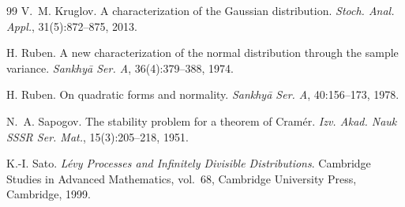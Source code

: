 \begin{thebibliography}{99}
V.~M. Kruglov.
\newblock A characterization of the Gaussian distribution.
\newblock \emph{Stoch. Anal. Appl.}, 31(5):872--875, 2013.

H. Ruben.
\newblock A new characterization of the normal distribution through the sample variance.
\newblock \emph{Sankhy\=a Ser. A}, 36(4):379--388, 1974.

H. Ruben.
\newblock On quadratic forms and normality.
\newblock \emph{Sankhy\=a Ser. A}, 40:156--173, 1978.

N.~A. Sapogov.
\newblock The stability problem for a theorem of Cram\'er.
\newblock \emph{Izv. Akad. Nauk SSSR Ser. Mat.}, 15(3):205--218, 1951.

K.-I. Sato.
\newblock \emph{L\'evy Processes and Infinitely Divisible Distributions}.
\newblock Cambridge Studies in Advanced Mathematics, vol.~68, Cambridge University Press, Cambridge, 1999.
\end{thebibliography}
